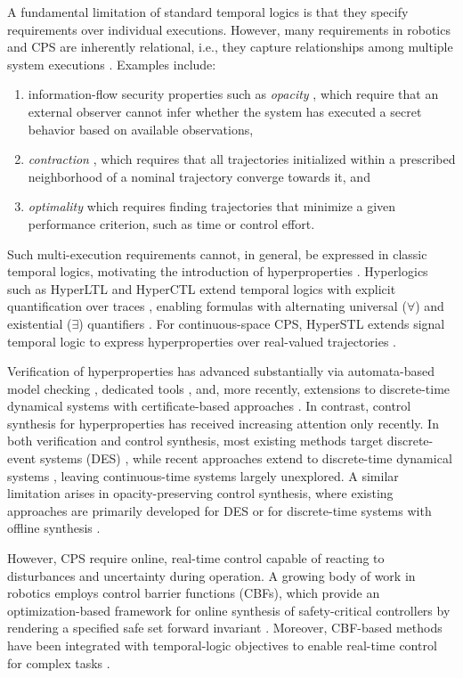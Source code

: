 \documentclass[letterpaper, 10 pt, conference]{ieeeconf}  %
\begin{document}
A fundamental limitation of standard temporal logics is that they specify requirements over individual executions. However, many requirements in robotics and CPS are inherently relational, i.e., they capture relationships among multiple system executions \cite{wang2020}. Examples include:
\begin{enumerate}
    \item information-flow security properties \cite{zhao2024} such as \emph{opacity} \cite{saboori2007}, which require that an external observer cannot infer whether the system has executed a secret behavior based on available observations,
    \item \emph{contraction} \cite{lohmiller1998}, which requires that all trajectories initialized within a prescribed neighborhood of a nominal trajectory converge towards it, and
    \item \emph{optimality} which requires finding trajectories that minimize a given performance criterion, such as time or control effort.
\end{enumerate}
Such multi-execution requirements cannot, in general, be expressed in classic temporal logics, motivating the introduction of hyperproperties \cite{clarkson2010}. Hyperlogics such as HyperLTL and HyperCTL extend temporal logics with explicit quantification over traces \cite{clarkson2014}, enabling formulas with alternating universal ($\forall$) and existential ($\exists$) quantifiers \cite{finkbeiner2015}. For continuous-space CPS, HyperSTL extends signal temporal logic to express hyperproperties over real-valued trajectories \cite{nguyen2017}.

Verification of hyperproperties has advanced substantially via automata-based model checking \cite{clarkson2014}, dedicated tools \cite{finkbeiner2015}, and, more recently, extensions to discrete-time dynamical systems with certificate-based approaches \cite{anand2024}. In contrast, control synthesis for hyperproperties has received increasing attention only recently. In both verification and control synthesis, most existing methods target discrete-event systems (DES) \cite{wang2020, finkbeiner2015}, while recent approaches extend to discrete-time dynamical systems \cite{anand2024, zhao2025}, leaving continuous-time systems largely unexplored. A similar limitation arises in opacity-preserving control synthesis, where existing approaches are primarily developed for DES \cite{yang2023, yu2022} or for discrete-time systems with offline synthesis \cite{zhong2025}.

However, CPS require online, real-time control capable of reacting to disturbances and uncertainty during operation. A growing body of work in robotics employs control barrier functions (CBFs), which provide an optimization-based framework for online synthesis of safety-critical controllers by rendering a specified safe set forward invariant \cite{ames2014, ames2019}. Moreover, CBF-based methods have been integrated with temporal-logic objectives to enable real-time control for complex tasks \cite{srinivasan2021, lindemann2019}.
\end{document}
